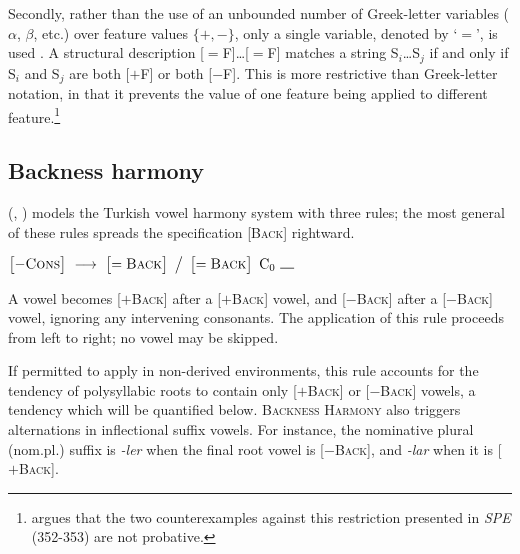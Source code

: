 Secondly, rather than the use of an unbounded number of Greek-letter variables ($\alpha$, $\beta$, etc.) over feature values $\{+, -\}$, only a single variable, denoted by `$=$', is used \citep{McCawley1973}. 
A structural description [$=$F]\ldots{}[$=$F] matches a string S$_i$\ldots{}S$_j$ if and only if S$_i$ and S$_j$ are both [$+$F] or both [$-$F].
This is more restrictive than Greek-letter notation, in that it prevents the value of one feature being applied to different feature.\footnote{
    \citet{Odden2012} argues that the two counterexamples against this restriction presented in \emph{SPE} (352-353) are not probative.}

\subsection{Backness harmony}
\label{ss:bh}

\citeauthor{Lees1966b} (\citeyear[35]{Lees1966b}, \citeyear[284]{Lees1966a}) models the Turkish vowel harmony system with three rules; the most general of these rules spreads the specification [\textsc{Back}] rightward.

\begin{example}
$\begin{bmatrix} -\textsc{Cons} \end{bmatrix}~\goesto~\begin{bmatrix} =\textsc{Back} \end{bmatrix}~\big /~\begin{bmatrix} =\textsc{Back} \end{bmatrix}~\textrm{C}_0~\gap$
\end{example}

\noindent
A vowel becomes [$+$\textsc{Back}] after a [$+$\textsc{Back}] vowel, and [$-$\textsc{Back}] after a [$-$\textsc{Back}] vowel, ignoring any intervening consonants. The application of this rule proceeds from left to right; no vowel may be skipped.

If permitted to apply in non-derived environments, this rule accounts for the tendency of polysyllabic roots to contain only [$+$\textsc{Back}] or [$-$\textsc{Back}] vowels, a tendency which will be quantified below. \textsc{Backness Harmony} also triggers alternations in inflectional suffix vowels. For instance, the nominative plural (nom.pl.) suffix is \emph{-ler} when the final root vowel is [$-$\textsc{Back}], and \emph{-lar} when it is [$+$\textsc{Back}].


